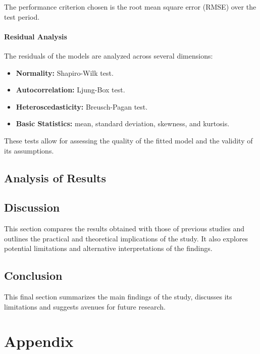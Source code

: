 \documentclass[12pt]{report}
\begin{document}
The performance criterion chosen is the root mean square error (RMSE) over the test period.

\subsubsection{Residual Analysis}

The residuals of the models are analyzed across several dimensions:
\begin{itemize}
    \item \textbf{Normality:} Shapiro-Wilk test.
    \item \textbf{Autocorrelation:} Ljung-Box test.
    \item \textbf{Heteroscedasticity:} Breusch-Pagan test.
    \item \textbf{Basic Statistics:} mean, standard deviation, skewness, and kurtosis.
\end{itemize}

These tests allow for assessing the quality of the fitted model and the validity of its assumptions.






\newpage
\section{Analysis of Results}





\newpage
\section{Discussion}
This section compares the results obtained with those of previous studies and outlines the practical and theoretical implications of the study. It also explores potential limitations and alternative
interpretations of the findings.

\newpage
\section{Conclusion}
This final section summarizes the main findings of the study, discusses its limitations and suggests avenues for future research.


\newpage
\printbibliography

\newpage
\chapter*{Appendix}


\end{document}
